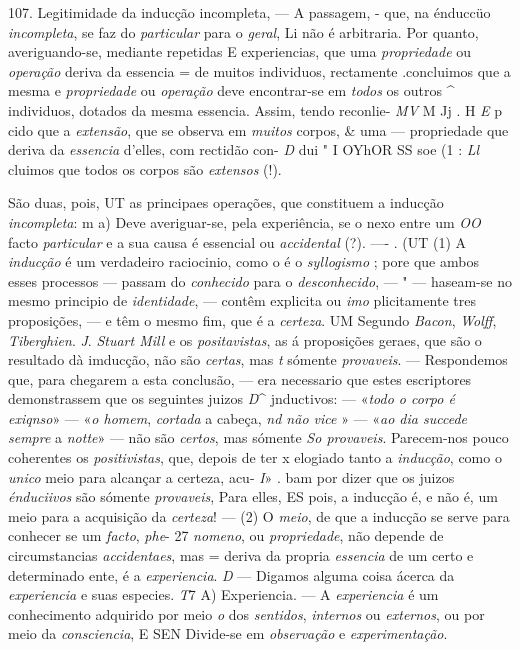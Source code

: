 107. Legitimidade da inducção incompleta, --- A passagem,   - que, na énduccüo \emph{incompleta}, se faz do \emph{particular} para o \emph{geral}, Li não é arbitraria. Por quanto, averiguando-se, mediante repetidas E experiencias, que uma \emph{propriedade} ou \emph{operação} deriva da essencia = de muitos individuos, rectamente .concluimos que a mesma e \emph{propriedade} ou \emph{operação} deve encontrar-se em \emph{todos} os outros \textasciicircum{} individuos, dotados da mesma essencia. Assim, tendo reconlie- \emph{MV} M Jj . H \emph{E} p cido que a \emph{extensão}, que se observa em \emph{muitos} corpos, \& uma --- propriedade que deriva da \emph{essencia} d'elles, com rectidão con- \emph{D} dui " I OYhOR SS soe (1 \textbar{} : \emph{Ll} cluimos que todos os corpos são \emph{extensos} (!).


São duas, pois, UT as principaes operações, que constituem a inducção \emph{incompleta}: m a) Deve averiguar-se, pela experiência, se o nexo entre um \emph{OO} facto \emph{particular} e a sua causa é essencial ou \emph{accidental} (?). ---- . (UT (1) A \emph{inducção} é um verdadeiro raciocinio, como o é o \emph{syllogismo} ; pore que ambos esses processos --- passam do \emph{conhecido} para o \emph{desconhecido}, --- " --- haseam-se no mesmo principio de \emph{identidade}, --- contêm explicita ou \emph{imo} plicitamente tres proposições, --- e têm o mesmo fim, que é a \emph{certeza}. UM Segundo \emph{Bacon}, \emph{Wolff}, \emph{Tiberghien}. \emph{J}. \emph{Stuart Mill} e os \emph{positavistas}, as á proposições geraes, que são o resultado dà imducção, não são \emph{certas}, mas \emph{t} sómente \emph{provaveis}. --- Respondemos que, para chegarem a esta conclusão, --- era necessario que estes escriptores demonstrassem que os seguintes juizos \emph{D}\textasciicircum{} jnductivos: --- «\emph{todo o corpo é exiqnso}» --- «\emph{o homem}, \emph{cortada} a cabeça, \emph{nd não vice} » --- «\emph{ao dia succede sempre} a \emph{notte}» --- não são \emph{certos}, mas sómente \emph{So provaveis}. Parecem-nos pouco coherentes os \emph{positivistas}, que, depois de ter x elogiado tanto a \emph{inducção}, como o \emph{unico} meio para alcançar a certeza, acu- \emph{I}» . bam por dizer que os juizos \emph{énduciivos} são sómente \emph{provaveis}, Para elles, ES pois, a inducção é, e não é, um meio para a acquisição da \emph{certeza}! --- (2) O \emph{meio}, de que a inducção se serve para conhecer se um \emph{facto}, \emph{phe}- 27 \emph{nomeno}, ou \emph{propriedade}, não depende de circumstancias \emph{accidentaes}, mas = deriva da propria \emph{essencia} de um certo e determinado ente, é a \emph{experiencia}. \emph{D} --- Digamos alguma coisa ácerca da \emph{experiencia} e suas especies. \emph{T}7 A) Experiencia. --- A \emph{experiencia} é um conhecimento adquirido por meio \emph{o} dos \emph{sentidos}, \emph{internos} ou \emph{externos}, ou por meio da \emph{consciencia}, E SEN Divide-se em \emph{observação} e \emph{experimentação}.


